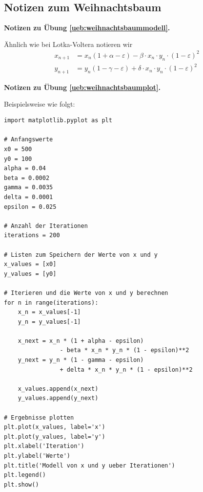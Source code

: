 \documentclass[%
11pt,%
twoside,%
titlepage,%
german,%
headsepline%
]{scrartcl}
\newcommand{\concatueb}[1]{ueb:#1}%
\newcommand{\concatlsg}[1]{lsg:#1}%
\newenvironment{lsg}[1]{%
    \par\noindent\textbf{Notizen zu Übung \ref{\concatueb{#1}}.}%
    \label{\concatlsg{#1}}
}{%
    \par%
}
\begin{document}
\clearpage

\subsection{Notizen zum Weihnachtsbaum}

\begin{lsg}{weihnachtsbaummodell}
Ähnlich wie bei Lotka-Voltera notieren wir
\begin{align*}
x_{n+1}&=x_n(1+\alpha-\varepsilon)-\beta\cdot x_n\cdot y_n\cdot(1-\varepsilon)^2\\
y_{n+1}&=y_n(1-\gamma-\varepsilon)+\delta\cdot x_n\cdot y_n\cdot(1-\varepsilon)^2
\end{align*}
\end{lsg}
\begin{lsg}{weihnachtsbaumplot}
Beispielsweise wie folgt:

\begin{lstlisting}
import matplotlib.pyplot as plt

# Anfangswerte
x0 = 500
y0 = 100
alpha = 0.04
beta = 0.0002
gamma = 0.0035
delta = 0.0001
epsilon = 0.025

# Anzahl der Iterationen
iterations = 200

# Listen zum Speichern der Werte von x und y
x_values = [x0]
y_values = [y0]

# Iterieren und die Werte von x und y berechnen
for n in range(iterations):
    x_n = x_values[-1]
    y_n = y_values[-1]
    
    x_next = x_n * (1 + alpha - epsilon) 
    			- beta * x_n * y_n * (1 - epsilon)**2
    y_next = y_n * (1 - gamma - epsilon) 
    			+ delta * x_n * y_n * (1 - epsilon)**2
    
    x_values.append(x_next)
    y_values.append(y_next)

# Ergebnisse plotten
plt.plot(x_values, label='x')
plt.plot(y_values, label='y')
plt.xlabel('Iteration')
plt.ylabel('Werte')
plt.title('Modell von x und y ueber Iterationen')
plt.legend()
plt.show()
\end{lstlisting}
\end{lsg}

\clearpage




\end{document}
